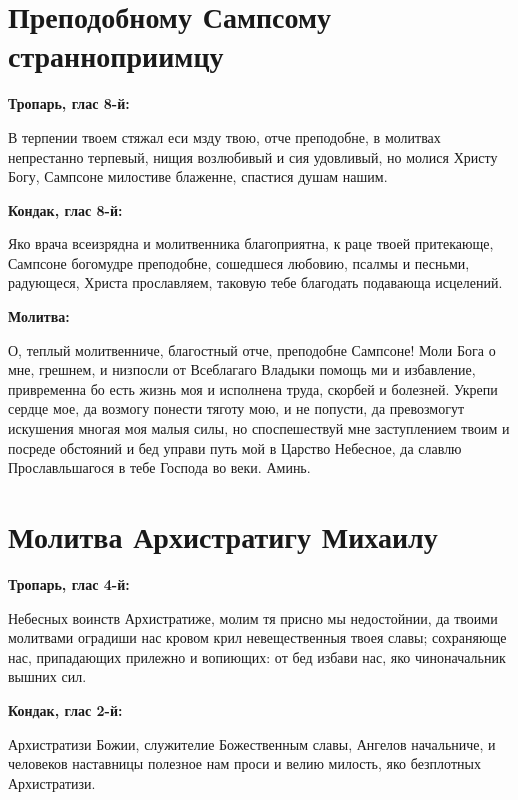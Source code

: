 \section{Преподобному Сампсому странноприимцу}
 


\bfseries Тропарь, глас 8-й:\normalfont{}\nopagebreak


В терпении твоем стяжал еси мзду твою, отче преподобне, в молитвах непрестанно терпевый, нищия возлюбивый и сия удовливый, но молися Христу Богу, Сампсоне милостиве блаженне, спастися душам нашим.


\medskip


\bfseries Кондак, глас 8-й:\normalfont{}\nopagebreak


Яко врача всеизрядна и молитвенника благоприятна, к раце твоей притекающе, Сампсоне богомудре преподобне, сошедшеся любовию, псалмы и песньми, радующеся, Христа прославляем, таковую тебе благодать подавающа исцелений.


\medskip


\bfseries Молитва:\normalfont{}\nopagebreak


О, теплый молитвенниче, благостный отче, преподобне Сампсоне! Моли Бога о мне, грешнем, и низпосли от Всеблагаго Владыки помощь ми и избавление, привременна бо есть жизнь моя и исполнена труда, скорбей и болезней. Укрепи сердце мое, да возмогу понести тяготу мою, и не попусти, да превозмогут искушения многая моя малыя силы, но споспешествуй мне заступлением твоим и посреде обстояний и бед управи путь мой в Царство Небесное, да славлю Прославльшагося в тебе Господа во веки. Аминь.


\section{Молитва Архистратигу Михаилу}
 


\bfseries Тропарь, глас 4-й:\normalfont{}\nopagebreak


Небесных воинств Архистратиже, молим тя присно мы недостойнии, да твоими молитвами оградиши нас кровом крил невещественныя твоея славы; сохраняюще нас, припадающих прилежно и вопиющих: от бед избави нас, яко чиноначальник вышних сил.


\medskip


\bfseries Кондак, глас 2-й:\normalfont{}\nopagebreak


Архистратизи Божии, служителие Божественным славы, Ангелов начальниче, и человеков наставницы полезное нам проси и велию милость, яко безплотных Архистратизи.



